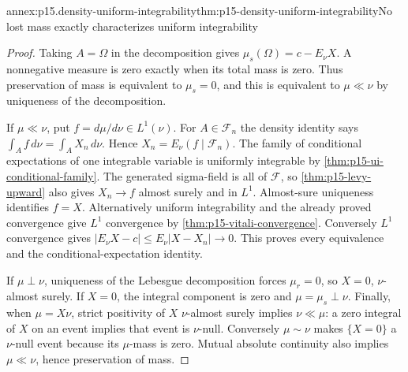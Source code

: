 \begin{annexitem}{annex:p15.density-uniform-integrability}{thm:p15-density-uniform-integrability}{No lost mass exactly characterizes uniform integrability}
\begin{proof}
Taking \(A=\Omega\) in the decomposition gives
\(\mu_s(\Omega)=c-E_\nu X\).
A nonnegative measure is zero exactly when its total mass is zero.
Thus preservation of mass is equivalent to \(\mu_s=0\), and this is
equivalent to \(\mu\ll\nu\) by uniqueness of the decomposition.

If \(\mu\ll\nu\), put \(f=d\mu/d\nu\in L^1(\nu)\).
For \(A\in\mathcal F_n\) the density identity says
\(\int_A f\,d\nu=\int_A X_n\,d\nu\).
Hence \(X_n=E_\nu(f\mid\mathcal F_n)\).
The family of conditional expectations of one integrable variable is
uniformly integrable by \cref{thm:p15-ui-conditional-family}.
The generated sigma-field is all of \(\mathcal F\), so
\cref{thm:p15-levy-upward} also gives \(X_n\to f\) almost surely
and in \(L^1\). Almost-sure uniqueness identifies \(f=X\).
Alternatively uniform integrability and the already proved convergence
give \(L^1\) convergence by \cref{thm:p15-vitali-convergence}.
Conversely \(L^1\) convergence gives
\(|E_\nu X-c|\leq E_\nu|X-X_n|\to0\).
This proves every equivalence and the conditional-expectation identity.

If \(\mu\perp\nu\), uniqueness of the Lebesgue decomposition forces
\(\mu_r=0\), so \(X=0\), \(\nu\)-almost surely.
If \(X=0\), the integral component is zero and \(\mu=\mu_s\perp\nu\).
Finally, when \(\mu=X\nu\), strict positivity of \(X\)
\(\nu\)-almost surely implies \(\nu\ll\mu\): a zero integral of \(X\)
on an event implies that event is \(\nu\)-null.
Conversely \(\mu\sim\nu\) makes \(\{X=0\}\) a \(\nu\)-null event
because its \(\mu\)-mass is zero. Mutual absolute continuity also
implies \(\mu\ll\nu\), hence preservation of mass.
\end{proof}
\end{annexitem}

